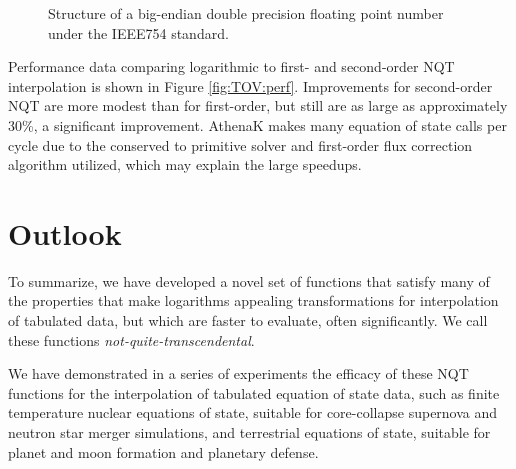 \documentclass[linenumbers,twocolumn]{aastex631}
\begin{document}
\begin{figure}[t!]
    \begin{center}
    \end{center}
    \caption{Structure of a big-endian double precision floating point number under the IEEE754 standard.}
    \label{fig:bits}
\end{figure}

Performance data comparing logarithmic to first- and second-order NQT interpolation is shown in Figure \ref{fig:TOV:perf}. Improvements for second-order NQT are more modest than for first-order, but still are as large as approximately 30\%, a significant improvement. AthenaK makes many equation of state calls per cycle due to the conserved to primitive solver and first-order flux correction algorithm utilized, which may explain the large speedups.

\section{Outlook}
\label{sec:outlook}

To summarize, we have developed a novel set of functions that satisfy many of the properties that make logarithms appealing transformations for interpolation of tabulated data, but which are faster to evaluate, often significantly. We call these functions \textit{not-quite-transcendental}.

We have demonstrated in a series of experiments the efficacy of these NQT functions for the interpolation of tabulated equation of state data, such as finite temperature nuclear equations of state, suitable for core-collapse supernova and neutron star merger simulations, and terrestrial equations of state, suitable for planet and moon formation and planetary defense. 
\end{document}
